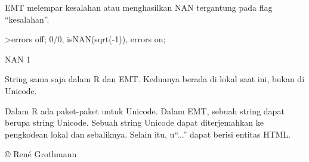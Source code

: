 \documentclass[a4paper,10pt]{article}
\begin{document}
\begin{eulernotebook}
\begin{eulercomment}
\begin{eulercomment}
\begin{eulercomment}
\begin{eulercomment}
\begin{eulercomment}
\begin{eulercomment}
\begin{eulercomment}
\begin{eulercomment}
\begin{eulercomment}
\begin{eulercomment}
\begin{eulercomment}
\begin{eulercomment}
\begin{eulercomment}
\begin{eulercomment}
\begin{eulercomment}
\begin{eulercomment}
\begin{eulercomment}
\begin{eulercomment}
\begin{eulercomment}
\begin{eulercomment}
\begin{eulercomment}
\begin{eulercomment}
\begin{eulercomment}
\begin{eulercomment}
\begin{eulercomment}
\begin{eulercomment}
\begin{eulercomment}
\begin{eulercomment}
\begin{eulercomment}
\begin{eulercomment}
\begin{eulercomment}
\begin{eulercomment}
\begin{eulercomment}
\begin{eulercomment}
\begin{eulercomment}
\begin{eulercomment}
\begin{eulercomment}
\begin{eulercomment}
\begin{eulercomment}
\begin{eulercomment}
\begin{eulercomment}
\begin{eulercomment}
\begin{eulercomment}
\begin{eulercomment}
\begin{eulercomment}
\begin{eulercomment}
\begin{eulercomment}
\begin{eulercomment}
\begin{euleroutput}
\end{euleroutput}
\begin{eulercomment}
EMT melempar kesalahan atau menghasilkan NAN tergantung pada flag
“kesalahan”.
\end{eulercomment}
\begin{eulerprompt}
>errors off; 0/0, isNAN(sqrt(-1)), errors on;
\end{eulerprompt}
\begin{euleroutput}
  NAN
  1
\end{euleroutput}
\begin{eulercomment}
String sama saja dalam R dan EMT. Keduanya berada di lokal saat ini,
bukan di Unicode.

Dalam R ada paket-paket untuk Unicode. Dalam EMT, sebuah string dapat
berupa string Unicode. Sebuah string Unicode dapat diterjemahkan ke
pengkodean lokal dan sebaliknya. Selain itu, u“...” dapat berisi
entitas HTML.
\end{eulercomment}
\begin{euleroutput}
  © René Grothmann
\end{euleroutput}
\begin{eulercomment}

\end{eulercomment}
\end{eulercomment}
\end{eulercomment}
\end{eulercomment}
\end{eulercomment}
\end{eulercomment}
\end{eulercomment}
\end{eulercomment}
\end{eulercomment}
\end{eulercomment}
\end{eulercomment}
\end{eulercomment}
\end{eulercomment}
\end{eulercomment}
\end{eulercomment}
\end{eulercomment}
\end{eulercomment}
\end{eulercomment}
\end{eulercomment}
\end{eulercomment}
\end{eulercomment}
\end{eulercomment}
\end{eulercomment}
\end{eulercomment}
\end{eulercomment}
\end{eulercomment}
\end{eulercomment}
\end{eulercomment}
\end{eulercomment}
\end{eulercomment}
\end{eulercomment}
\end{eulercomment}
\end{eulercomment}
\end{eulercomment}
\end{eulercomment}
\end{eulercomment}
\end{eulercomment}
\end{eulercomment}
\end{eulercomment}
\end{eulercomment}
\end{eulercomment}
\end{eulercomment}
\end{eulercomment}
\end{eulercomment}
\end{eulercomment}
\end{eulercomment}
\end{eulercomment}
\end{eulercomment}
\end{eulercomment}
\end{eulernotebook}
\end{document}
